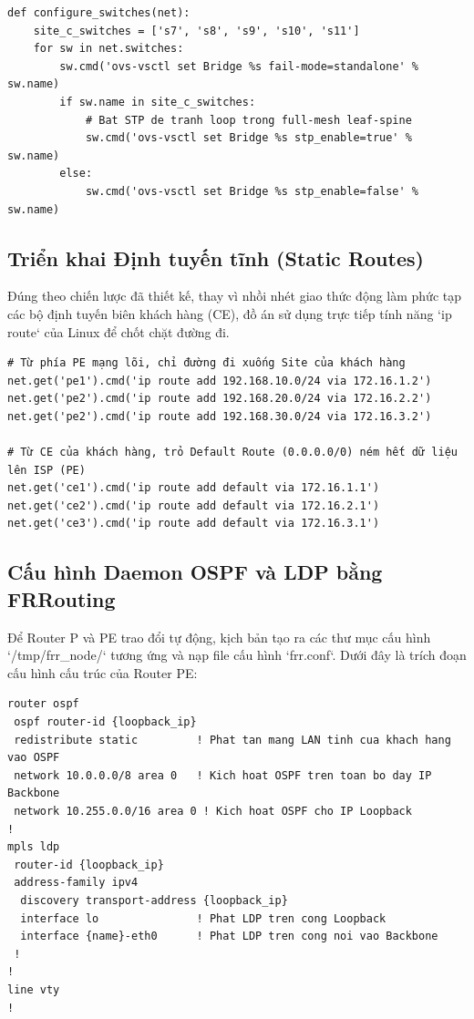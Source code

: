 \begin{lstlisting}[style=powershell, caption={Đoạn code thiết lập Switch và chống Loop bằng OVS-VSCTL}]
def configure_switches(net):
    site_c_switches = ['s7', 's8', 's9', 's10', 's11']
    for sw in net.switches:
        sw.cmd('ovs-vsctl set Bridge %s fail-mode=standalone' % sw.name)
        if sw.name in site_c_switches:
            # Bat STP de tranh loop trong full-mesh leaf-spine
            sw.cmd('ovs-vsctl set Bridge %s stp_enable=true' % sw.name)
        else:
            sw.cmd('ovs-vsctl set Bridge %s stp_enable=false' % sw.name)
\end{lstlisting}

\subsection{Triển khai Định tuyến tĩnh (Static Routes)}
Đúng theo chiến lược đã thiết kế, thay vì nhồi nhét giao thức động làm phức tạp các bộ định tuyến biên khách hàng (CE), đồ án sử dụng trực tiếp tính năng `ip route` của Linux để chốt chặt đường đi.

\begin{lstlisting}[style=powershell, caption={Khởi tạo đường tĩnh biên CE-PE bằng lệnh Linux IP}]
# Từ phía PE mạng lõi, chỉ đường đi xuống Site của khách hàng
net.get('pe1').cmd('ip route add 192.168.10.0/24 via 172.16.1.2')
net.get('pe2').cmd('ip route add 192.168.20.0/24 via 172.16.2.2')
net.get('pe2').cmd('ip route add 192.168.30.0/24 via 172.16.3.2')

# Từ CE của khách hàng, trỏ Default Route (0.0.0.0/0) ném hết dữ liệu lên ISP (PE)
net.get('ce1').cmd('ip route add default via 172.16.1.1')
net.get('ce2').cmd('ip route add default via 172.16.2.1')
net.get('ce3').cmd('ip route add default via 172.16.3.1')
\end{lstlisting}

\subsection{Cấu hình Daemon OSPF và LDP bằng FRRouting}
Để Router P và PE trao đổi tự động, kịch bản tạo ra các thư mục cấu hình `/tmp/frr_node/` tương ứng và nạp file cấu hình `frr.conf`. Dưới đây là trích đoạn cấu hình cấu trúc của Router PE:

\begin{lstlisting}[style=powershell, caption={Cấu hình định dạng của FRR áp dụng cho Router PE}]
router ospf
 ospf router-id {loopback_ip}
 redistribute static         ! Phat tan mang LAN tinh cua khach hang vao OSPF
 network 10.0.0.0/8 area 0   ! Kich hoat OSPF tren toan bo day IP Backbone
 network 10.255.0.0/16 area 0 ! Kich hoat OSPF cho IP Loopback
!
mpls ldp
 router-id {loopback_ip}
 address-family ipv4
  discovery transport-address {loopback_ip}
  interface lo               ! Phat LDP tren cong Loopback
  interface {name}-eth0      ! Phat LDP tren cong noi vao Backbone
 !
!
line vty
!
\end{lstlisting}

